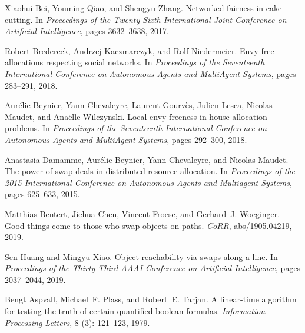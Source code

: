 \begin{thebibliography}{27}
Xiaohui Bei, Youming Qiao, and Shengyu Zhang.
\newblock Networked fairness in cake cutting.
\newblock In \emph{Proceedings of the Twenty-Sixth International Joint
  Conference on Artificial Intelligence}, pages 3632--3638, 2017.

Robert Bredereck, Andrzej Kaczmarczyk, and Rolf Niedermeier.
\newblock Envy-free allocations respecting social networks.
\newblock In \emph{Proceedings of the Seventeenth International Conference on
  Autonomous Agents and MultiAgent Systems}, pages 283--291, 2018.

Aur{\'e}lie Beynier, Yann Chevaleyre, Laurent Gourv{\`e}s, Julien Lesca,
  Nicolas Maudet, and Ana{\"e}lle Wilczynski.
\newblock Local envy-freeness in house allocation problems.
\newblock In \emph{Proceedings of the Seventeenth International Conference on
  Autonomous Agents and MultiAgent Systems}, pages 292--300, 2018.

Anastasia Damamme, Aur{\'e}lie Beynier, Yann Chevaleyre, and Nicolas Maudet.
\newblock The power of swap deals in distributed resource allocation.
\newblock In \emph{Proceedings of the 2015 International Conference on
  Autonomous Agents and Multiagent Systems}, pages 625--633, 2015.

Matthias Bentert, Jiehua Chen, Vincent Froese, and Gerhard~J. Woeginger.
\newblock Good things come to those who swap objects on paths.
\newblock \emph{CoRR}, abs/1905.04219, 2019.

Sen Huang and Mingyu Xiao.
\newblock Object reachability via swaps along a line.
\newblock In \emph{Proceedings of the Thirty-Third AAAI Conference on
  Artificial Intelligence}, pages 2037--2044, 2019.

Bengt Aspvall, Michael~F. Plass, and Robert~E. Tarjan.
\newblock A linear-time algorithm for testing the truth of certain quantified
  boolean formulas.
\newblock \emph{Information Processing Letters}, 8 (3):
  121--123, 1979.


\end{thebibliography}
